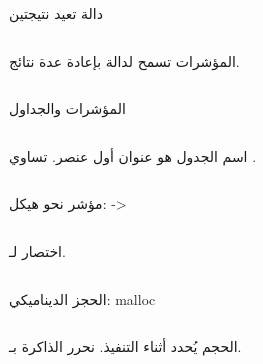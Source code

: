 \documentclass[aspectratio=169, 11pt, t, xcolor={table}]{beamer}
\begin{document}
\begin{frame}[t]{دالة تعيد نتيجتين}
    \begin{columns}[T]
        {\small المؤشرات تسمح لدالة بإعادة عدة نتائج.\par}
        \vspace{0.3cm}
    \end{columns}
\end{frame}

\begin{frame}[t]{المؤشرات والجداول}
    \begin{columns}[T]
        {\small اسم الجدول هو عنوان أول عنصر.  تساوي .\par}
        \vspace{0.3cm}
    \end{columns}
\end{frame}

\begin{frame}[t]{مؤشر نحو هيكل: \textenglish{->}}
    \begin{columns}[T]
        {\small {} اختصار لـ.\par}
        \vspace{0.3cm}
    \end{columns}
\end{frame}

\begin{frame}[t]{الحجز الديناميكي: \textenglish{malloc}}
    \begin{columns}[T]
        {\small الحجم يُحدد أثناء التنفيذ. نحرر الذاكرة بـ.\par}
        \vspace{0.3cm}
    \end{columns}
\end{frame}
\end{document}
